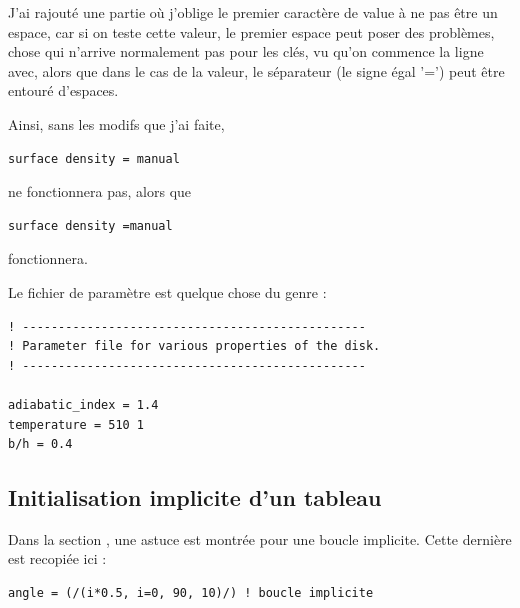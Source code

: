 \documentclass[a4paper,twoside]{article}
\begin{document}
\begin{attention}
J'ai rajouté une partie où j'oblige le premier caractère de value à ne pas être un espace, car si on teste cette valeur, le premier espace peut poser des problèmes, chose qui n'arrive normalement pas pour les clés, vu qu'on commence la ligne avec, alors que dans le cas de la valeur, le séparateur (le signe égal '=') peut être entouré d'espaces.

Ainsi, sans les modifs que j'ai faite, 
\begin{verbatim}
surface density = manual
\end{verbatim}
ne fonctionnera pas, alors que
\begin{verbatim}
surface density =manual
\end{verbatim}
fonctionnera.
\end{attention}


Le fichier de paramètre est quelque chose du genre :
\begin{verbatim}
! ------------------------------------------------
! Parameter file for various properties of the disk. 
! ------------------------------------------------

adiabatic_index = 1.4
temperature = 510 1
b/h = 0.4
\end{verbatim}

\subsection{Initialisation implicite d'un tableau}
Dans la section , une astuce est montrée pour une boucle implicite. Cette dernière est recopiée ici : 
\begin{verbatim}
angle = (/(i*0.5, i=0, 90, 10)/) ! boucle implicite
\end{verbatim}
\end{document}
